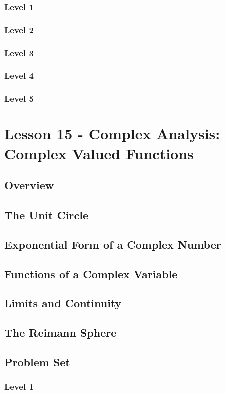 \documentclass{article}
\begin{document}
\subsubsection{Level 1}
\subsubsection{Level 2}
\subsubsection{Level 3}
\subsubsection{Level 4}
\subsubsection{Level 5}
\pagebreak

\section{Lesson 15 - Complex Analysis: Complex Valued Functions}
\subsection{Overview}
\subsection{The Unit Circle}
\subsection{Exponential Form of a Complex Number}
\subsection{Functions of a Complex Variable}
\subsection{Limits and Continuity}
\subsection{The Reimann Sphere}
\subsection{Problem Set}
\subsubsection{Level 1}
\end{document}
